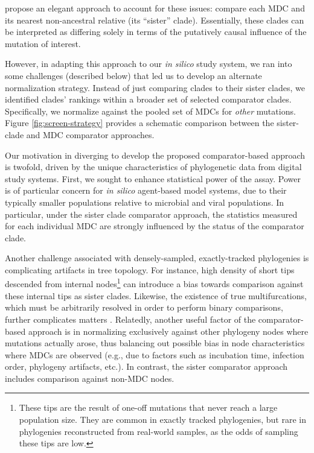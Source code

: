 \citet{BonettiFranceschi2024phylogenetic} propose an elegant approach to account for these issues: compare each MDC and its nearest non-ancestral relative (its ``sister'' clade).
Essentially, these clades can be interpreted as differing solely in terms of the putatively causal influence of the mutation of interest.



However, in adapting this approach to our \textit{in silico} study system, we ran into some challenges (described below) that led us to develop an alternate normalization strategy. Instead of just comparing clades to their sister clades, we identified clades' rankings within a broader set of selected comparator clades.
Specifically, we normalize against the pooled set of MDCs for \textit{other} mutations.
Figure \ref{fig:screen-strategy} provides a schematic comparison between the sister-clade and MDC comparator approaches.

Our motivation in diverging to develop the proposed comparator-based approach is twofold, driven by the unique characteristics of phylogenetic data from digital study systems.
First, we sought to enhance statistical power of the assay.
Power is of particular concern for \textit{in silico} agent-based model systems, due to their typically smaller populations relative to microbial and viral populations.
In particular, under the sister clade comparator approach, the statistics measured for each individual MDC are strongly influenced by the status of the comparator clade.

Another challenge associated with densely-sampled, exactly-tracked phylogenies is complicating artifacts in tree topology.
For instance, high density of short tips descended from internal nodes\footnote{These tips are the result of one-off mutations that never reach a large population size. They are common in exactly tracked phylogenies, but rare in phylogenies reconstructed from real-world samples, as the odds of sampling these tips are low.} can introduce a bias towards comparison against these internal tips as sister clades.
Likewise, the existence of true multifurcations, which must be arbitrarily resolved in order to perform binary comparisons, further complicates matters \citep{dolson2024phylotrack}.
Relatedly, another useful factor of the comparator-based approach is in normalizing exclusively against other phylogeny nodes where mutations actually arose, thus balancing out possible bias in node characteristics where MDCs are observed (e.g., due to factors such as incubation time, infection order, phylogeny artifacts, etc.).
In contrast, the sister comparator approach includes comparison against non-MDC nodes.

